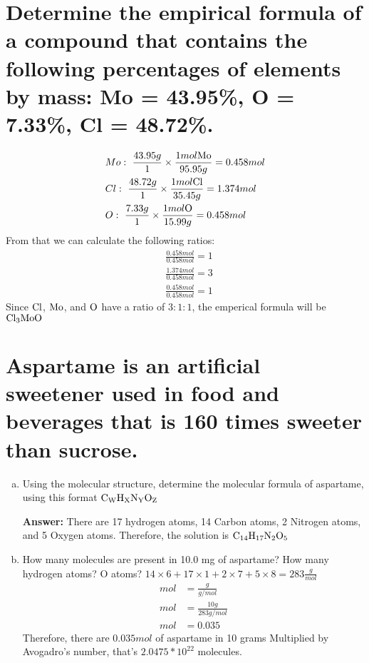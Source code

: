 \documentclass[11pt]{article}
\begin{document}
\section{Determine the empirical formula of a compound that contains the following percentages of elements by mass: Mo = 43.95\%, O = 7.33\%, Cl = 48.72\%.}
\label{sec:orgea40d58}
\begin{align*}
&Mo:\ \frac{43.95g}{1}\times\frac{1mol\ce{Mo}}{95.95g}=0.458mol\\
&Cl:\ \frac{48.72g}{1}\times\frac{1mol\ce{Cl}}{35.45g}=1.374mol\\
&O:\ \frac{7.33g}{1}\times\frac{1mol\ce{O}}{15.99g}=0.458mol
\end{align*}
From that we can calculate the following ratios:
\begin{align*}
&\frac{0.458mol}{0.458mol}=1\\
&\frac{1.374mol}{0.458mol}=3\\
&\frac{0.458mol}{0.458mol}=1
\end{align*}
 Since \(\ce{Cl}\), \(\ce{Mo}\), and  \(\ce{O}\) have a ratio of \(3:1:1\), the
emperical formula will be  \(\ce{Cl3MoO}\)

\section{Aspartame is an artificial sweetener used in food and beverages that is 160 times sweeter than sucrose.}
\label{sec:orga46f6c0}
\begin{enumerate}[(a)]
\item Using the molecular structure, determine the molecular formula of aspartame,
using this format \(\ce{C_{W}H_{X}N_{Y}O_{Z}}\)

\textbf{Answer:} There are 17 hydrogen atoms, 14 Carbon atoms, 2 Nitrogen atoms, and 5 Oxygen atoms. Therefore, the solution is \(\ce{C14H17N2O5}\)
\item How many molecules are present in 10.0 mg of aspartame? How many hydrogen atoms? O atoms?
\(14\times6+17\times1+2\times7+5\times8=283\frac{g}{mol}\)
\begin{align*}
mol&=\frac{g}{g/mol}\\
mol&=\frac{10g}{283g/mol}\\
mol&=0.035
\end{align*}
Therefore, there are \(0.035mol\) of aspartame in 10 grams
Multiplied by Avogadro's number, that's \(2.0475*10^{22}\) molecules.
\end{enumerate}
\end{document}
